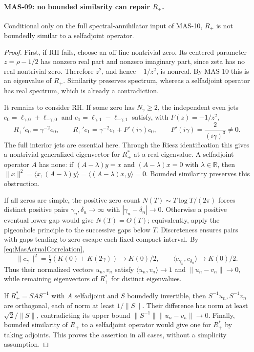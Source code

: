 \documentclass[11pt,a4paper]{article}
\newcommand{\R}{\mathbb R}
\newcommand{\fid}[1]{\textsf{#1}}
\begin{document}
\paragraph{MAS-09: no bounded similarity can repair $R_+$.}
Conditional only on the full spectral-annihilator input of \fid{MAS-10}, $R_+$ is not boundedly similar to a selfadjoint operator.
\begin{proof}
First, if RH fails, choose an off-line nontrivial zero. Its centered parameter $z=\rho-1/2$ has nonzero real part and nonzero imaginary part, since zeta has no real nontrivial zero. Therefore $z^2$, and hence $-1/z^2$, is nonreal. By \fid{MAS-10} this is an eigenvalue of $R_+$. Similarity preserves spectrum, whereas a selfadjoint operator has real spectrum, which is already a contradiction.

It remains to consider RH. If some zero has $N_\gamma\ge2$, the independent even jets
$e_0=\ell_{\gamma,0}+\ell_{-\gamma,0}$ and
$e_1=\ell_{\gamma,1}-\ell_{-\gamma,1}$ satisfy, with $F(z)=-1/z^2$,
\[
 R_+'e_0=\gamma^{-2}e_0,\qquad
 R_+'e_1=\gamma^{-2}e_1+F'(i\gamma)e_0,\qquad
 F'(i\gamma)=\frac{2}{(i\gamma)^3}\ne0.
\]
The full interior jets are essential here. Through the Riesz identification this gives a nontrivial generalized eigenvector for $R_+^*$ at a real eigenvalue. A selfadjoint operator $A$ has none: if
$(A-\lambda)y=x$ and $(A-\lambda)x=0$ with $\lambda\in\R$, then
$\|x\|^2=\langle x,(A-\lambda)y\rangle=\langle(A-\lambda)x,y\rangle=0$.
Bounded similarity preserves this obstruction.

If all zeros are simple, the positive zero count $N(T)\sim T\log T/(2\pi)$ forces distinct positive pairs $\gamma_n,\delta_n\to\infty$ with $|\gamma_n-\delta_n|\to0$. Otherwise a positive eventual lower gap would give $N(T)=O(T)$; equivalently, apply the pigeonhole principle to the successive gaps below $T$. Discreteness ensures pairs with gaps tending to zero escape each fixed compact interval.
By \eqref{eq:MasActualCorrelation},
\[
 \|c_\gamma\|^2=\tfrac12(K(0)+K(2\gamma))\longrightarrow K(0)/2,
 \qquad
 \langle c_{\gamma_n},c_{\delta_n}\rangle\longrightarrow K(0)/2.
\]
Thus their normalized vectors $u_n,v_n$ satisfy
$\langle u_n,v_n\rangle\to1$ and $\|u_n-v_n\|\to0$, while remaining eigenvectors of $R_+^*$ for distinct eigenvalues.

If $R_+^*=SAS^{-1}$ with $A$ selfadjoint and $S$ boundedly invertible, then
$S^{-1}u_n,S^{-1}v_n$ are orthogonal, each of norm at least $1/\|S\|$. Their difference has norm at least $\sqrt2/\|S\|$, contradicting its upper bound
$\|S^{-1}\|\|u_n-v_n\|\to0$. Finally, bounded similarity of $R_+$ to a selfadjoint operator would give one for $R_+^*$ by taking adjoints. This proves the assertion in all cases, without a simplicity assumption.
\end{proof}
\end{document}
